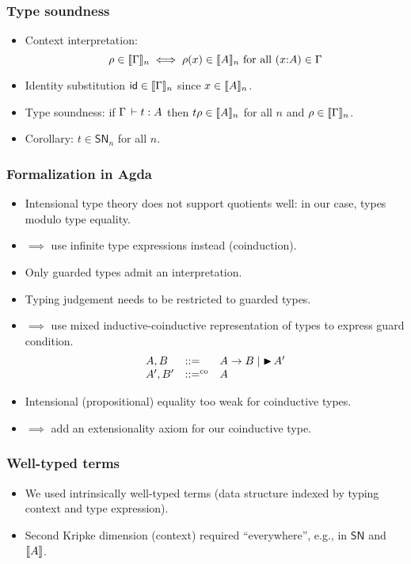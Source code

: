 \documentclass[t]{beamer}
\renewcommand{\SN}{\mathsf{SN}}
\newcommand{\tid}{\mathsf{id}}
\begin{document}
\begin{frame}%
  \frametitle{Type soundness}
  \begin{itemize}
  \item Context interpretation:
\[
  \rho \in \llbracket \Gamma \rrbracket_{n} \iff \rho(x) \in \llbracket A \rrbracket_{n} \ \mbox{for all}\ 
  (x{:}A) \in \Gamma
\]
\vspace{-2ex}
  \item Identity substitution $\tid \in \Den \Gamma n$ since $x \in \llbracket A \rrbracket_{n}$.
  \item Type soundness: if $\Gamma \,\vdash t : A$ then $t \rho \in \llbracket A \rrbracket_{n}$ for all $n$ and $\rho \in \llbracket \Gamma \rrbracket_{n}$.
  \item Corollary: $t \in \SN_n$ for all $n$.
  \end{itemize}
\end{frame}


\begin{frame}%
  \frametitle{Formalization in Agda}
  \begin{itemize}
  \item Intensional type theory does not support quotients well: in
    our case, types modulo type equality.
  \item $\implies$ use infinite type expressions instead (coinduction).
  \item Only guarded types admit an interpretation.
  \item Typing judgement needs to be restricted to guarded types.
  \item $\implies$ use mixed inductive-coinductive representation of
    types to express guard condition.
\[
\begin{array}{lll}
  A,B    & ::= & A \to B \mid \mathord{\blacktriangleright}\, A' \\
  A',B'  & ::=^{\mathrm{co}} & A \\
\end{array}
\]
  \item Intensional (propositional) equality too weak for coinductive
    types.
  \item $\implies$ add an extensionality axiom for our coinductive type.
  \end{itemize}
\end{frame}


\begin{frame}%
  \frametitle{Well-typed terms}
  \begin{itemize}
  \item We used intrinsically well-typed terms (data structure indexed
    by typing context and type expression).
  \item Second Kripke dimension (context) required ``everywhere'', e.g.,
    in $\SN$ and $\llbracket A \rrbracket$.
  \end{itemize}
\end{frame}
\end{document}
